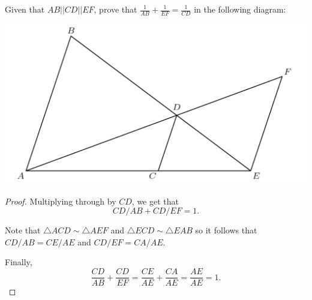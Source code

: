 \documentclass[12pt]{scrartcl}
\newcommand{\<}{\langle}
\renewcommand{\>}{\rangle}
\begin{document}
\begin{Prob} Given that $AB || CD || EF$, prove that $\frac{1}{AB} + \frac{1}{EF} = \frac{1}{CD}$ in the following diagram:
\begin{center}
\includegraphics[scale=0.5]{graphics/simTri.png}
\end{center}
\end{Prob}
\begin{proof}
Multiplying through by $CD$, we get that 
$$CD/AB + CD/EF = 1.$$

Note that $\triangle ACD \sim \triangle AEF$ and $\triangle ECD \sim \triangle EAB$ so it follows that $CD/AB = CE/AE$ and $CD/EF = CA/AE$.

Finally,
$$\frac{CD}{AB} + \frac{CD}{EF} = \dfrac{CE}{AE}+\dfrac{CA}{AE} = \dfrac{AE}{AE} = 1.$$
\end{proof}
\end{document}
